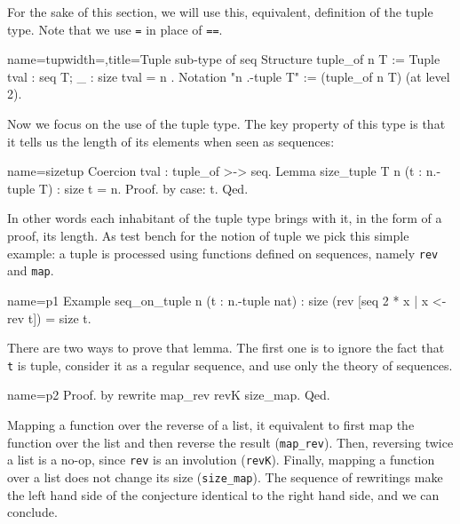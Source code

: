 For the sake of this section, we will use this, equivalent, definition
of the tuple type.  Note that we use \lstinline/=/ in place of
\lstinline/==/.

\begin{coq}{name=tup}{width=\textwidth,title=Tuple sub-type of seq}
Structure tuple_of n T := Tuple { tval : seq T; _ : size tval = n }.
Notation "n .-tuple T" := (tuple_of n T) (at level 2).
\end{coq}


Now we focus on the use of the tuple type.  The key property of this
type is that it tells us the length of its elements when seen as
sequences:

\begin{coq}{name=sizetup}{}
Coercion tval : tuple_of >-> seq.
Lemma size_tuple {T n} (t : n.-tuple T) : size t = n.
Proof. by case: t. Qed.
\end{coq}

In other words each inhabitant of the tuple type brings with it,
in the form of a proof, its length.  As test bench for the notion
of tuple we pick this simple example: a tuple is processed using
functions defined on sequences, namely \lstinline/rev/ and
\lstinline/map/.

\begin{coq}{name=p1}{}
Example seq_on_tuple n (t : n.-tuple nat) :
  size (rev [seq 2 * x | x <- rev t]) = size t.
\end{coq}

There are two ways to prove that lemma.  The first one is
to ignore the fact that \lstinline/t/ is tuple, consider it
as a regular sequence, and use only the theory of sequences.

\begin{coq}{name=p2}{}
Proof. by rewrite map_rev revK size_map. Qed.
\end{coq}

Mapping a function over the reverse of a list, it equivalent to
first map the function over the list and then reverse the result
(\lstinline/map_rev/).  Then, reversing twice a list is a no-op, since
\lstinline/rev/ is an involution
(\lstinline/revK/).  Finally, mapping a function over a list does not
change its size (\lstinline/size_map/).  The sequence of rewritings
make the left hand side of the conjecture identical to the right hand
side, and we can conclude.

